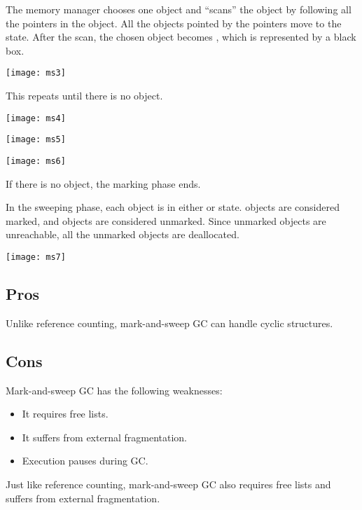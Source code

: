 The memory manager chooses one \uscn object and ``scans'' the object by
following all the pointers in the object.  All the \urch objects pointed by the
pointers move to the \uscn state. After the scan, the chosen object becomes
\scn, which is represented by a black box.

\begin{center}
\texttt{[image: ms3]}
\end{center}

This repeats until there is no \uscn object.

\begin{center}
\texttt{[image: ms4]}

\texttt{[image: ms5]}

\texttt{[image: ms6]}
\end{center}

If there is no \uscn object, the marking phase ends.

In the sweeping phase, each object is in either \urch or \scn state.  \scn
objects
are considered marked, and \urch objects are considered unmarked.  Since unmarked
objects are unreachable, all the unmarked objects are deallocated.

\begin{center}
\texttt{[image: ms7]}
\end{center}

\subsection{Pros}

Unlike reference counting, mark-and-sweep GC can handle cyclic structures.

\subsection{Cons}

Mark-and-sweep GC has the following weaknesses:

\begin{itemize}
  \item It requires free lists.
  \item It suffers from external fragmentation.
  \item Execution pauses during GC.
\end{itemize}

Just like reference counting, mark-and-sweep GC also requires free lists and
suffers from external fragmentation.

